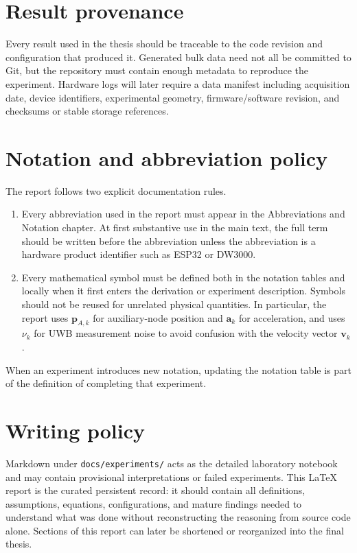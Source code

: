 \section{Result provenance}
Every result used in the thesis should be traceable to the code revision and configuration that produced it. Generated bulk data need not all be committed to Git, but the repository must contain enough metadata to reproduce the experiment. Hardware logs will later require a data manifest including acquisition date, device identifiers, experimental geometry, firmware/software revision, and checksums or stable storage references.

\section{Notation and abbreviation policy}
The report follows two explicit documentation rules.
\begin{enumerate}
    \item Every abbreviation used in the report must appear in the Abbreviations and Notation chapter. At first substantive use in the main text, the full term should be written before the abbreviation unless the abbreviation is a hardware product identifier such as ESP32 or DW3000.
    \item Every mathematical symbol must be defined both in the notation tables and locally when it first enters the derivation or experiment description. Symbols should not be reused for unrelated physical quantities. In particular, the report uses $\bm{p}_{A,k}$ for auxiliary-node position and $\bm{a}_k$ for acceleration, and uses $\nu_k$ for UWB measurement noise to avoid confusion with the velocity vector $\bm{v}_k$.
\end{enumerate}
When an experiment introduces new notation, updating the notation table is part of the definition of completing that experiment.

\section{Writing policy}
Markdown under \texttt{docs/experiments/} acts as the detailed laboratory notebook and may contain provisional interpretations or failed experiments. This LaTeX report is the curated persistent record: it should contain all definitions, assumptions, equations, configurations, and mature findings needed to understand what was done without reconstructing the reasoning from source code alone. Sections of this report can later be shortened or reorganized into the final thesis.
